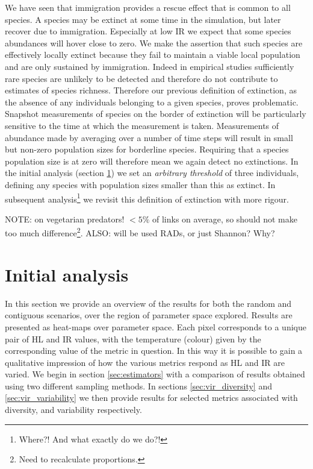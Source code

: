 We have seen that immigration provides a rescue effect that is common to all species. A species may be extinct at some time in the simulation, but later recover due to immigration. Especially at low IR we expect that some species abundances will hover close to zero. We make the assertion that such species are effectively locally extinct because they fail to maintain a viable local population and are only sustained by immigration. Indeed in empirical studies sufficiently rare species are unlikely to be detected and therefore do not contribute to estimates of species richness. 
Therefore our previous definition of extinction, as the absence of any individuals belonging to a given species, proves problematic. Snapshot measurements of species on the border of extinction will be particularly sensitive to the time at which the measurement is taken. Measurements of abundance made by averaging over a number of time steps will result in small but non-zero population sizes for borderline species. Requiring that a species population size is at zero will therefore mean we again detect no extinctions. In the initial analysis (section \ref{sec:init_res}) we set an \emph{arbitrary threshold} of three individuals, defining any species with population sizes smaller than this as extinct. In subsequent analysis\footnote{Where?! And what exactly do we do?!} we revisit this definition of extinction with more rigour. 

NOTE: on vegetarian predators! $<5\%$ of links on average, so should not make too much difference\footnote{Need to recalculate proportions.}.
ALSO: will be used RADs, or just Shannon? Why?


\section{Initial analysis}
\label{sec:init_res}

In this section we provide an overview of the results for both the random and contiguous scenarios, over the region of parameter space explored. Results are presented as heat-maps over parameter space. Each pixel corresponds to a unique pair of HL and IR values, with the temperature (colour) given by the corresponding value of the metric in question. In this way it is possible to gain a qualitative impression of how the various metrics respond as HL and IR are varied. We begin in section \ref{sec:estimators} with a comparison of results obtained using two different sampling methods. In sections \ref{sec:vir_diversity} and \ref{sec:vir_variability} we then provide results for selected metrics associated with diversity, and variability respectively. 

